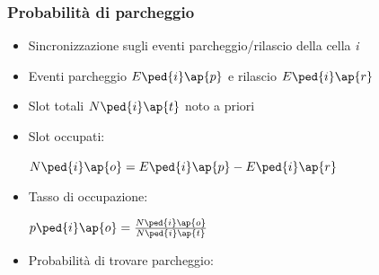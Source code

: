 \documentclass{beamer}
\begin{document}
\begin{frame}
\frametitle{Probabilità di parcheggio}

\begin{itemize}
  \item Sincronizzazione sugli eventi parcheggio/rilascio della cella \textit{i}
  \item Eventi parcheggio $E\ped{i}\ap{p}$ e rilascio $E\ped{i}\ap{r}$
  \item Slot totali $N\ped{i}\ap{t}$ noto a priori
  \item Slot occupati:
  \\
  {\centering $N\ped{i}\ap{o} = E\ped{i}\ap{p} - E\ped{i}\ap{r}$\par}
  \vspace{2mm}
  \item Tasso di occupazione:
  \\
  {\centering $p\ped{i}\ap{o} = \frac{N\ped{i}\ap{o}}{N\ped{i}\ap{t}}$\par}
  \vspace{2mm}
  \item Probabilità di trovare parcheggio:
  \\
  \vspace{4mm}
  \centering {}
\end{itemize}
\end{frame}
\end{document}
